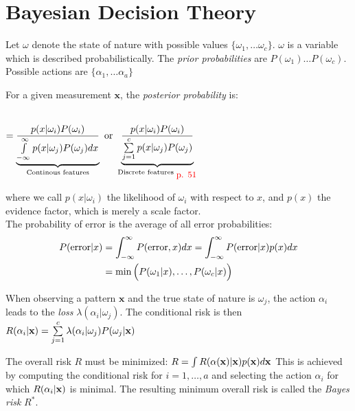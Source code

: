 \section{Bayesian Decision Theory}
\begin{minipage}{9.5cm}
  Let $\omega$ denote the state of nature with possible values $\{\omega_1, \ldots \omega_c\}$.
  $\omega$ is a variable which is described probabilistically.
  The \emph{prior probabilities} are $P(\omega_1) \ldots P(\omega_c)$.
  Possible actions are $\{\alpha_1, \ldots \alpha_a\}$

  For a given measurement $\mathbf{x}$, the \emph{posterior probability} is:
  \begin{center}
     \\
    $= \underbrace{\frac{p(x|\omega_i) P(\omega_i)}{\int\limits_{-\infty}^{\infty}p(x|\omega_j) P(\omega_j) dx}}_{\text{Continous features}}
     \text{ or } 
     \underbrace{\frac{p(x|\omega_i) P(\omega_i)}{\sum\limits_{j=1}^{c}p(x|\omega_j) P(\omega_j)}}_{\text{Discrete features $_{\textcolor{red}{\mbox{\small{p. 51}}}}$}}$
  \end{center}
  
where we call $p(x|\omega_i)$ the likelihood of $\omega_i$ with respect to $x$,
and $p(x)$ the evidence factor, which is merely a scale factor. \\

The probability of error is the average of all error probabilities:
  \begin{align*}
      P(\mathrm{error}|x) &= \int_{-\infty}^{\infty} P(\mathrm{error}, x) dx = \int_{-\infty}^{\infty} P(\mathrm{error}|x) p(x) dx \\
       &= \min\Big(P(\omega_1|x), \ldots, P(\omega_c|x)\Big)
  \end{align*}


When observing a pattern $\mathbf{x}$ and the true state of nature is $\omega_j$,
the action $\alpha_i$ leads to the \emph{loss} $\lambda(\alpha_i|\omega_j)$.
The conditional risk is then 
$R(\alpha_i|\mathbf{x}) = \sum\limits_{j=1}^c \lambda(\alpha_i|\omega_j)P(\omega_j|\mathbf{x})$

The overall risk $R$ must be minimized:
$R = \int R(\alpha(\mathbf{x})|\mathbf{x})p(\mathbf{x}) d\mathbf{x}$
This is achieved by computing the conditional risk for $i=1,\ldots,a$ 
and selecting the action $\alpha_i$ for which $R(\alpha_i|\mathbf{x})$ is minimal.
The resulting minimum overall risk is called the \emph{Bayes risk} $R^*$.
  
\end{minipage} \vspace{1cm}
